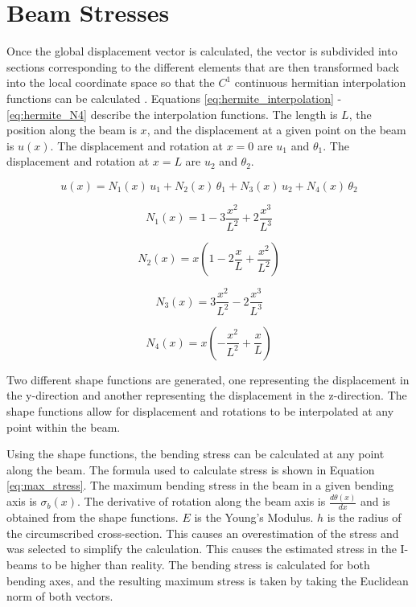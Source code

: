 \documentclass[doublespace,nopageskip]{VTthesis}
\begin{document}
		
	\section{Beam Stresses} \label{se:beamstress}
	
	Once the global displacement vector is calculated, the vector is subdivided into sections corresponding to the different elements that are then transformed back into the local coordinate space so that the $C^1$ continuous hermitian interpolation functions can be calculated \cite{feabook}. Equations \ref{eq:hermite_interpolation} - \ref{eq:hermite_N4} describe the interpolation functions. The length is $L$, the position along the beam is $x$, and the displacement at a given point on the beam is $u(x)$. The displacement and rotation at $x=0$ are $u_1$ and $\theta_1$.  The displacement and rotation at $x=L$ are $u_2$ and $\theta_2$.  
	
	\begin{equation}
		u(x) = N_1(x) \, u_1 + N_2(x) \, \theta_1 + N_3(x) \, u_2 + N_4(x) \, \theta_2
		\label{eq:hermite_interpolation}
	\end{equation}
	
	\begin{equation}
		N_1(x) = 1 - 3\frac{x^2}{L^2} + 2\frac{x^3}{L^3}
		\label{eq:hermite_N1}
	\end{equation}
	
	\begin{equation}
		N_2(x) = x \left( 1 - 2\frac{x}{L} + \frac{x^2}{L^2} \right)
		\label{eq:hermite_N2}
	\end{equation}
	
	\begin{equation}
		N_3(x) = 3 \frac{x^2}{L^2} - 2\frac{x^3}{L^3}
		\label{eq:hermite_N3}
	\end{equation}
	
	\begin{equation}
		N_4(x) = x \left( -\frac{x^2}{L^2} + \frac{x}{L} \right)
		\label{eq:hermite_N4}
	\end{equation}
		
 	Two different shape functions are generated, one representing the displacement in the y-direction and another representing the displacement in the z-direction. The shape functions allow for displacement and rotations to be interpolated at any point within the beam. 

	Using the shape functions, the bending stress can be calculated at any point along the beam. The formula used to calculate stress is shown in Equation \ref{eq:max_stress}. The maximum bending stress in the beam in a given bending axis is $\sigma_b(x)$. The derivative of rotation along the beam axis is $\frac{d\theta(x)}{dx}$ and is obtained from the shape functions. $E$ is the Young's Modulus. $h$ is the radius of the circumscribed cross-section. This causes an overestimation of the stress and was selected to simplify the calculation. This causes the estimated stress in the I-beams to be higher than reality. The bending stress is calculated for both bending axes, and the resulting maximum stress is taken by taking the Euclidean norm of both vectors.   
\end{document}
